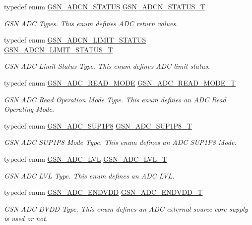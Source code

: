 \begin{DoxyCompactItemize}
typedef enum \hyperlink{a00643_gaac5e6c70aa098ca208218da35914fa93}{GSN\_\-ADCN\_\-STATUS} \hyperlink{a00643_gac8232626400d1264d361acee029bc36f}{GSN\_\-ADCN\_\-STATUS\_\-T}
\begin{DoxyCompactList}\small\item\em GSN ADC Types. This enum defines ADC return values. \end{DoxyCompactList}\item 
typedef enum \hyperlink{a00643_ga008458c1074bf0e3aace6adfc8a9a7d7}{GSN\_\-ADCN\_\-LIMIT\_\-STATUS} \hyperlink{a00643_gadcd568439f5ada07d7d96a582f37096f}{GSN\_\-ADCN\_\-LIMIT\_\-STATUS\_\-T}
\begin{DoxyCompactList}\small\item\em GSN ADC Limit Status Type. This enum defines ADC limit status. \end{DoxyCompactList}\item 
typedef enum \hyperlink{a00643_ga99061f6e0169c89e57e4cd5d5ce1596c}{GSN\_\-ADC\_\-READ\_\-MODE} \hyperlink{a00643_ga67df3ab0d6b619d585d941ad1f3f0233}{GSN\_\-ADC\_\-READ\_\-MODE\_\-T}
\begin{DoxyCompactList}\small\item\em GSN ADC Read Operation Mode Type. This enum defines an ADC Read Operating Mode. \end{DoxyCompactList}\item 
typedef enum \hyperlink{a00643_gadc3afaf6a966c7c6199e4d8f37da8b73}{GSN\_\-ADC\_\-SUP1P8} \hyperlink{a00643_ga79b5244aa923d094c80c37462b10dded}{GSN\_\-ADC\_\-SUP1P8\_\-T}
\begin{DoxyCompactList}\small\item\em GSN ADC SUP1P8 Mode Type. This enum defines an ADC SUP1P8 Mode. \end{DoxyCompactList}\item 
typedef enum \hyperlink{a00643_ga3309e4e970c6632c63ec80fb739e7c0e}{GSN\_\-ADC\_\-LVL} \hyperlink{a00643_ga5a94fb4298f40809bab65da9dd446da7}{GSN\_\-ADC\_\-LVL\_\-T}
\begin{DoxyCompactList}\small\item\em GSN ADC LVL Type. This enum defines an ADC LVL. \end{DoxyCompactList}\item 
typedef enum \hyperlink{a00643_gae153aad95b81d706fe521df66b313c27}{GSN\_\-ADC\_\-ENDVDD} \hyperlink{a00643_ga704b8e4a05f99219d70f32cbf2fb4ca5}{GSN\_\-ADC\_\-ENDVDD\_\-T}
\begin{DoxyCompactList}\small\item\em GSN ADC DVDD Type. This enum defines an ADC external source core supply is used or not. \end{DoxyCompactList}\item 

\end{DoxyCompactItemize}
